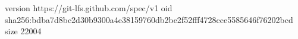 version https://git-lfs.github.com/spec/v1
oid sha256:bdba7d8bc2d30b9300a4e38159760db2be2f52fff4728cce5585646f76202bcd
size 22004

